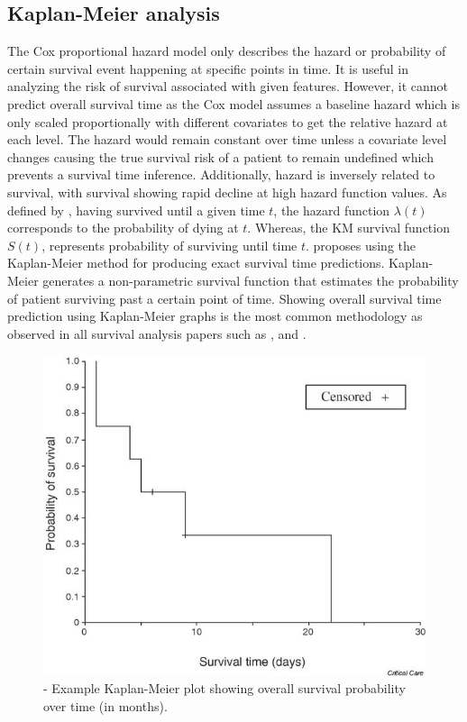 \documentclass{l4proj}
\begin{document}
\subsection{Kaplan-Meier analysis} \label{km-background}
The Cox proportional hazard model only describes the hazard or probability of certain survival event happening at specific points in time. It is useful in analyzing the risk of survival associated with given features. However, it cannot predict overall survival time as the Cox model assumes a baseline hazard which is only scaled proportionally with different covariates to get the relative hazard at each level. The hazard would remain constant over time unless a covariate level changes causing the true survival risk of a patient to remain undefined which prevents a survival time inference. Additionally, hazard is inversely related to survival, with survival showing rapid decline at high hazard function values. As defined by \cite{bewick2004statistics}, having survived until a given time \(t\), the hazard function \(\lambda (t)\) corresponds to the probability of dying at \(t\). Whereas, the KM survival function \(S(t)\), represents probability of surviving until time \(t\). \cite{schober2021kaplan} proposes using the Kaplan-Meier method for producing exact survival time predictions. Kaplan-Meier generates a non-parametric survival function that estimates the probability of patient surviving past a certain point of time. Showing overall survival time prediction using Kaplan-Meier graphs is the most common methodology as observed in all survival analysis papers such as \cite{Kather2019}, \cite{Liu2022} and \cite{Wetstein2022}.

\begin{figure}[h]
    \centering
    \includegraphics[scale=0.3]{images/KM-plot-example.jpg}
    \caption{\cite{bewick2004statistics} - Example Kaplan-Meier plot showing overall survival probability over time (in months). }
    \label{fig:km-plot-example}
\end{figure}
\end{document}
